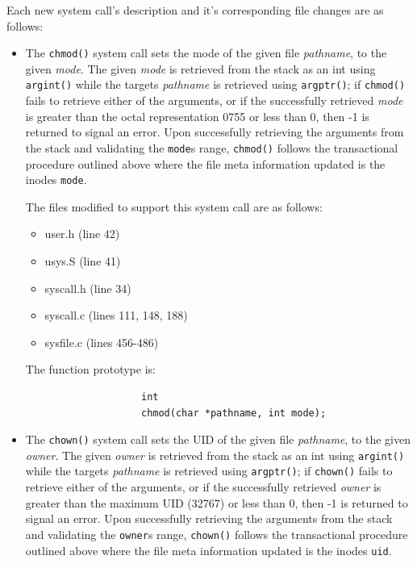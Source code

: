 \documentclass[11pt,letterpaper]{report}
\begin{document}
        Each new system call's description and it's corresponding file changes are as follows:

		\begin{itemize}

			\item The {\tt chmod()} system call sets the mode of the given file \emph{pathname}, to the given \emph{mode}. The given \emph{mode}
				is retrieved from the stack as an int using {\tt argint()} while the targets \emph{pathname} is retrieved using  {\tt argptr()}; if {\tt chmod()} fails to retrieve
				either of the arguments, or if the successfully retrieved \emph{mode} is greater than the octal representation 0755 or less than 0, then -1 is returned to signal an error.
				Upon successfully retrieving the arguments from the stack and validating the {\tt mode}s range, {\tt chmod()} follows the transactional procedure outlined above where 
				the file meta information updated is the inodes {\tt mode}.
							 
				 The files modified to support this system call are as follows:				
					\begin{itemize}
										
					\item user.h (line 42)
					\item usys.S (line 41)
					\item syscall.h (line 34)
					\item syscall.c (lines 111, 148, 188)
					\item sysfile.c (lines 456-486)
					
					\end{itemize}
			
				The function prototype is:
				\begin{verbatim}
					int
					chmod(char *pathname, int mode);
				\end{verbatim}

			\item The {\tt chown()} system call sets the UID of the given file \emph{pathname}, to the given \emph{owner}. The given \emph{owner}
				is retrieved from the stack as an int using {\tt argint()} while the targets \emph{pathname} is retrieved using  {\tt argptr()}; if {\tt chown()} fails to retrieve
				either of the arguments, or if the successfully retrieved \emph{owner} is greater than the maximum UID (32767) or less than 0, then -1 is returned to signal an error.
				Upon successfully retrieving the arguments from the stack and validating the {\tt owner}s range, {\tt chown()} follows the transactional procedure outlined above where 
				the file meta information updated is the inodes {\tt uid}.
							 

\end{itemize}
\end{document}
